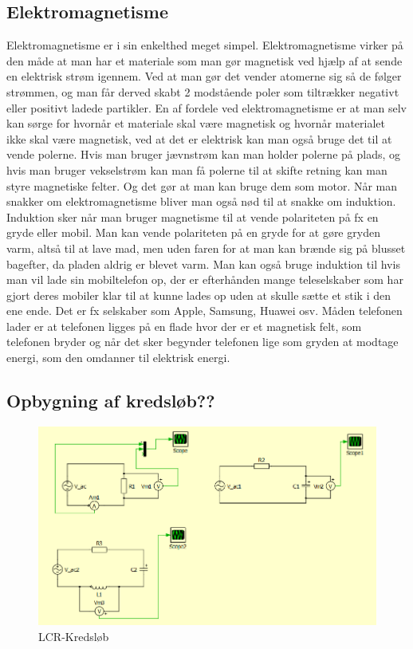\subsection{Elektromagnetisme}
Elektromagnetisme er i sin enkelthed meget simpel. Elektromagnetisme virker på den måde at man har et materiale som man gør magnetisk ved hjælp af at sende en elektrisk strøm igennem. Ved at man gør det vender atomerne sig så de følger strømmen, og man får derved skabt 2 modstående poler som tiltrækker negativt eller positivt ladede partikler. En af fordele ved elektromagnetisme er at man selv kan sørge for hvornår et materiale skal være magnetisk og hvornår materialet ikke skal være magnetisk, ved at det er elektrisk kan man også bruge det til at vende polerne. Hvis man bruger jævnstrøm kan man holder polerne på plads, og hvis man bruger vekselstrøm kan man få polerne til at skifte retning kan man styre magnetiske felter. Og det gør at man kan bruge dem som motor. Når man snakker om elektromagnetisme bliver man også nød til at snakke om induktion. Induktion sker når man bruger magnetisme til at vende polariteten på fx en gryde eller mobil. Man kan vende polariteten på en gryde for at gøre gryden varm, altså til at lave mad, men uden faren for at man kan brænde sig på blusset bagefter, da pladen aldrig er blevet varm. Man kan også bruge induktion til hvis man vil lade sin mobiltelefon op, der er efterhånden mange teleselskaber som har gjort deres mobiler klar til at kunne lades op uden at skulle sætte et stik i den ene ende. Det er fx selskaber som Apple, Samsung, Huawei osv. Måden telefonen lader er at telefonen ligges på en flade hvor der er et magnetisk felt, som telefonen bryder og når det sker begynder telefonen lige som gryden at modtage energi, som den omdanner til elektrisk energi.
\newpage
\subsection{Opbygning af kredsløb??}
\begin{figure}[htbp]
	\centering
	\includegraphics[width=1\textwidth]{Vildledning/Schematics/Eks1_LCR.png}
	\caption{LCR-Kredsløb}
\end{figure}

